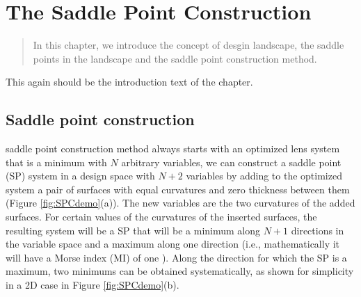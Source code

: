 \chapter{The Saddle Point Construction}
\label{chapter_2}
\graphicspath{ {./chapter-sp/figures/} }
\captionsetup[figure]{labelfont=bf}
\captionsetup{margin=1.5em}
\captionsetup[table]{labelfont=bf}




\begin{abstract}
In this chapter, we introduce the concept of desgin landscape, the saddle points in the landscape and the saddle point construction method. 
\end{abstract}

\newpage

\noindent 
This again should be the introduction text of the chapter.

\section{Saddle point construction}

 saddle point construction method always starts with an optimized lens system that is a minimum with $N$ arbitrary variables, we can construct a saddle point (SP) system in a design space with $N + 2$ variables by adding to the optimized system a pair of surfaces with equal curvatures and zero thickness between them (Figure \ref{fig:SPCdemo}(a)). The new variables are the two curvatures of the added surfaces. For certain values of the curvatures of the inserted surfaces, the resulting system will be a SP that will be a minimum along $N + 1$ directions in the variable space and a maximum along one direction (i.e., mathematically it will have a Morse index (MI) of one \cite{MVTurnhoutSPC15}). Along the direction for which the SP is a maximum, two minimums can be obtained systematically, as shown for simplicity in a 2D case in Figure \ref{fig:SPCdemo}(b).

